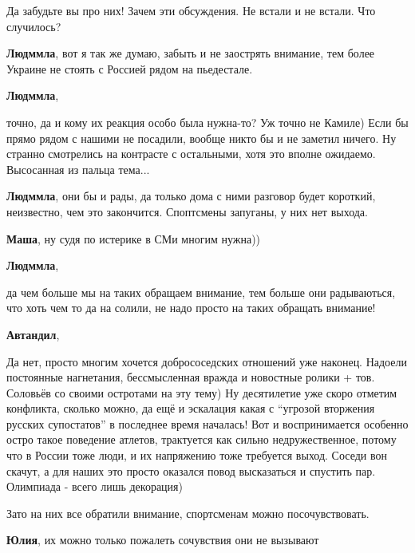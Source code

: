 \begin{itemize}

Да забудьте вы про них! Зачем эти обсуждения. Не встали и не встали. Что
случилось?

\begin{itemize} %
\textbf{Людммла}, вот я так же думаю, забыть и не заострять внимание, тем более Украине не стоять с Россией рядом на пьедестале.

\textbf{Людммла}, 

точно, да и кому их реакция особо была нужна-то? Уж точно не Камиле) Если бы
прямо рядом с нашими не посадили, вообще никто бы и не заметил ничего. Ну
странно смотрелись на контрасте с остальными, хотя это вполне ожидаемо.
Высосанная из пальца тема...

\textbf{Людммла}, они бы и рады, да только дома с ними разговор будет короткий, неизвестно, чем это закончится. Споптсмены запуганы, у них нет выхода.

\textbf{Маша}, ну судя по истерике в СМи многим нужна))

\textbf{Людммла}, 

да чем больше мы на таких обращаем внимание, тем больше они радываються, что
хоть чем то да на солили, не надо просто на таких обращать внимание!


\textbf{Автандил}, 

Да нет, просто многим хочется добрососедских отношений уже наконец. Надоели
постоянные нагнетания, бессмысленная вражда и новостные ролики + тов. Соловьёв
со своими остротами на эту тему) Ну десятилетие уже скоро отметим конфликта,
сколько можно, да ещё и эскалация какая с \enquote{угрозой вторжения русских
супостатов} в последнее время началась! Вот и воспринимается особенно остро
такое поведение атлетов, трактуется как сильно недружественное, потому что в
России тоже люди, и их напряжению тоже требуется выход. Соседи вон скачут, а
для наших это просто оказался повод высказаться и спустить пар. Олимпиада -
всего лишь декорация)

\end{itemize} %


Зато на них все обратили внимание, спортсменам можно посочувствовать.

\begin{itemize} %
\textbf{Юлия}, их можно только пожалеть сочувствия они не вызывают


\end{itemize}
\end{itemize}
